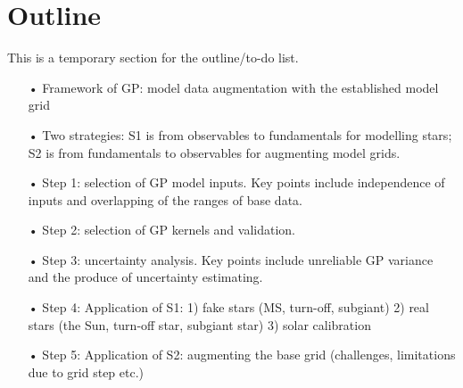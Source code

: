 \section{Outline}
This is a temporary section for the outline/to-do list. 
\begin{itemize}
\item[•] Framework of GP: model data augmentation with the established model grid
\item[•] Two strategies: S1 is from observables to fundamentals for modelling stars; S2 is from fundamentals to observables for augmenting model grids. \item[•] Step 1: selection of GP model inputs. Key points include independence of inputs and overlapping of the ranges of base data. 
\item[•] Step 2: selection of GP kernels and validation. 
\item[•] Step 3: uncertainty analysis. Key points include unreliable GP variance and the produce of uncertainty estimating.
\item[•] Step 4: Application of S1: 1) fake stars (MS, turn-off, subgiant) 2) real stars (the Sun, turn-off star, subgiant star) 3) solar calibration
\item[•] Step 5: Application of S2: augmenting the base grid (challenges, limitations due to grid step etc.)
\end{itemize} 
